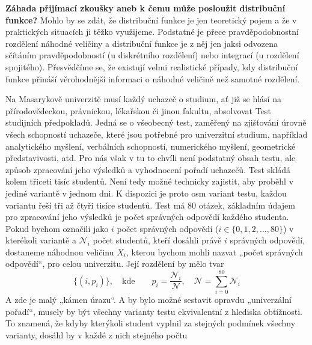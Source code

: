 \begin{mdframed}[style=mdexam]
  \begin{example}\label{mai:exam075}
    \textbf{Záhada přijímací zkoušky aneb k čemu může posloužit distribuční funkce?}\newline
    Mohlo by se zdát, že distribuční funkce je jen teoretický pojem a že v praktických situacích ji
    těžko využijeme. Podstatné je přece pravděpodobnostní rozdělení náhodné veličiny a distribuční
    funkce je z něj jen jaksi odvozena sčítáním pravděpodobností (u diskrétního rozdělení) nebo
    integrací (u rozdělení spojitého). Přesvědčíme se, že existují velmi realistické případy, kdy
    distribuční funkce přináší věrohodnější informaci o náhodné veličině než samotné rozdělení.
    
    Na Masarykově univerzitě musí každý uchazeč o studium, ať již se hlásí na přírodovědeckou,
    právnickou, lékařskou či jinou fakultu, absolvovat Test studijních předpokladů. Jedná se o
    všeobecný test, zaměřený na zjišťování úrovně všech schopností uchazeče, které jsou potřebné pro
    univerzitní studium, například analytického myšlení, verbálních schopností, numerického myšlení,
    geometrické představivosti, atd. Pro nás však v tu to chvíli není podstatný obsah testu, ale
    způsob zpracování jeho výsledků a vyhodnocení pořadí uchazečů. Test skládá kolem třiceti tisíc
    studentů. Není tedy možné technicky zajistit, aby proběhl v jediné variantě v jednom dni. K
    dispozici je proto osm variant testu, každou variantu řeší tři až čtyři tisíce studentů. Test má
    \num{80} otázek, základním údajem pro zpracování jeho výsledků je počet správných odpovědí
    každého studenta. Pokud bychom označili jako \(i\) počet správných odpovědí (\(i \in\lbrace0, 1,
    2, \ldots, 80\rbrace\)) v kterékoli variantě a \(\mathcal{N}_i\) počet studentů, kteří dosáhli
    právě \(i\) správných odpovědí, dostaneme náhodnou veličinu \(X_i\), kterou bychom mohli nazvat
    „počet správných odpovědí“, pro celou univerzitu. Její rozdělení by mělo tvar
    \begin{equation*}
      \lbrace(i,p_i)\rbrace,\quad\text{kde}\qquad p_i = \dfrac{\mathcal{N}_i}{\mathcal{N}}, \quad
      \mathcal{N} = \sum_{i=0}^{80}\mathcal{N}_i
    \end{equation*}
    A zde je malý „kámen úrazu“. A by bylo možné sestavit opravdu „univerzální pořadí“, musely by
    být všechny varianty testu ekvivalentní z hlediska obtížnosti. To znamená, že kdyby kterýkoli
    student vyplnil za stejných podmínek všechny varianty, dosáhl by v každé z nich stejného počtu

\end{example}
\end{mdframed}
